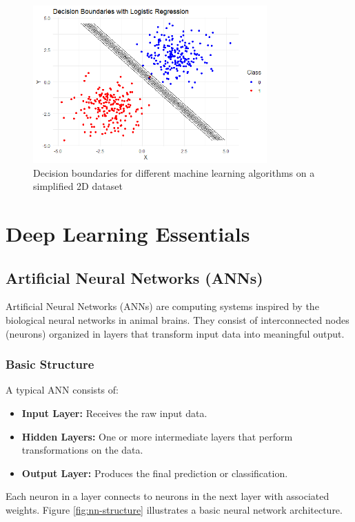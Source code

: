 \documentclass[11pt,a4paper]{report}
\begin{document}
\begin{figure}[ht]
    \centering
    \includegraphics[width=0.8\textwidth]{ml_algorithm_comparison.png}
    \caption{Decision boundaries for different machine learning algorithms on a simplified 2D dataset}
    \label{fig:ml-algorithms}
\end{figure}

\chapter{Deep Learning Essentials}
\section{Artificial Neural Networks (ANNs)}

Artificial Neural Networks (ANNs) are computing systems inspired by the biological neural networks in animal brains. They consist of interconnected nodes (neurons) organized in layers that transform input data into meaningful output.

\subsection{Basic Structure}
A typical ANN consists of:

\begin{itemize}
    \item \textbf{Input Layer:} Receives the raw input data.
    \item \textbf{Hidden Layers:} One or more intermediate layers that perform transformations on the data.
    \item \textbf{Output Layer:} Produces the final prediction or classification.
\end{itemize}

Each neuron in a layer connects to neurons in the next layer with associated weights. Figure \ref{fig:nn-structure} illustrates a basic neural network architecture.
\end{document}
